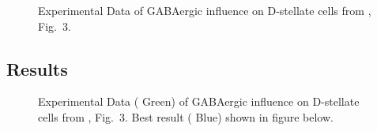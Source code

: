 \begin{figure}[htb]
\centering
{}
\caption{Experimental Data of GABAergic influence on D-stellate cells from \citep{BackoffPalombiEtAl:1997}, Fig.~3.}\label{Ch3:fig:DSClickRecoveryExpData}
\end{figure}


\clearpage
\subsection{Results}


\begin{figure}[htb!]
  \centering
{}
\caption{Experimental Data ({\color{green} Green}) of GABAergic influence on D-stellate cells from \citep{BackoffPalombiEtAl:1997}, Fig.~3.  Best result ({\color{blue} Blue}) shown in figure below.} \label{fig:DS_ClickRecovery_result}  
\end{figure}







